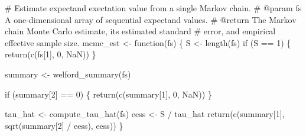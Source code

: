 \documentclass[
  letterpaper,
  DIV=11,
  numbers=noendperiod]{scrartcl}
\newenvironment{Shaded}{\begin{snugshade}}{\end{snugshade}}
\newcommand{\CommentTok}[1]{\textcolor[rgb]{0.37,0.37,0.37}{#1}}
\newcommand{\ControlFlowTok}[1]{\textcolor[rgb]{0.00,0.23,0.31}{#1}}
\newcommand{\DecValTok}[1]{\textcolor[rgb]{0.68,0.00,0.00}{#1}}
\newcommand{\NormalTok}[1]{\textcolor[rgb]{0.00,0.23,0.31}{#1}}
\newcommand{\OperatorTok}[1]{\textcolor[rgb]{0.37,0.37,0.37}{#1}}
\begin{document}
\begin{Shaded}
\begin{Highlighting}[]
\CommentTok{\# Estimate expectand exectation value from a single Markov chain.}
\CommentTok{\# @param fs A one{-}dimensional array of sequential expectand values.}
\CommentTok{\# @return The Markov chain Monte Carlo estimate, its estimated standard }
\CommentTok{\#         error, and empirical effective sample size.}
\NormalTok{mcmc\_est }\OperatorTok{\textless{}{-}}\NormalTok{ function(fs) \{}
\NormalTok{  S }\OperatorTok{\textless{}{-}}\NormalTok{ length(fs)}
  \ControlFlowTok{if}\NormalTok{ (S }\OperatorTok{==} \DecValTok{1}\NormalTok{) \{}
    \ControlFlowTok{return}\NormalTok{(c(fs[}\DecValTok{1}\NormalTok{], }\DecValTok{0}\NormalTok{, NaN))}
\NormalTok{  \}}

\NormalTok{  summary }\OperatorTok{\textless{}{-}}\NormalTok{ welford\_summary(fs)}

  \ControlFlowTok{if}\NormalTok{ (summary[}\DecValTok{2}\NormalTok{] }\OperatorTok{==} \DecValTok{0}\NormalTok{) \{}
    \ControlFlowTok{return}\NormalTok{(c(summary[}\DecValTok{1}\NormalTok{], }\DecValTok{0}\NormalTok{, NaN))}
\NormalTok{  \}}

\NormalTok{  tau\_hat }\OperatorTok{\textless{}{-}}\NormalTok{ compute\_tau\_hat(fs)}
\NormalTok{  eess }\OperatorTok{\textless{}{-}}\NormalTok{ S }\OperatorTok{/}\NormalTok{ tau\_hat}
  \ControlFlowTok{return}\NormalTok{(c(summary[}\DecValTok{1}\NormalTok{], sqrt(summary[}\DecValTok{2}\NormalTok{] }\OperatorTok{/}\NormalTok{ eess), eess))}
\NormalTok{\}}
\end{Highlighting}
\end{Shaded}
\end{document}
